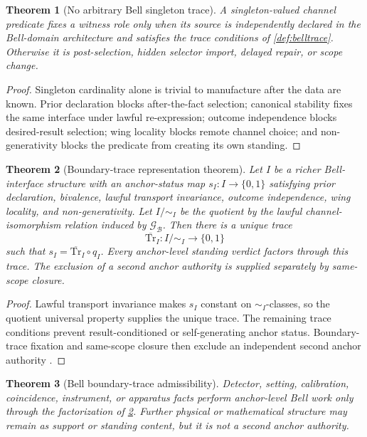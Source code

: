 \documentclass[11pt]{article}
\newtheorem{theorem}{Theorem}[section]
\theoremstyle{definition}
\newcommand{\Bell}{\mathcal{B}}
\newcommand{\Trace}{\mathrm{Tr}}
\newcommand{\BellLaw}{\mathscr{G}_{\Bell}}
\begin{document}
\begin{theorem}[No arbitrary Bell singleton trace]\label{thm:noarbitrarytrace}
A singleton-valued channel predicate fixes a witness role only when its source is independently declared in the Bell-domain architecture and satisfies the trace conditions of \cref{def:belltrace}. Otherwise it is post-selection, hidden selector import, delayed repair, or scope change.
\end{theorem}

\begin{proof}
Singleton cardinality alone is trivial to manufacture after the data are known. Prior declaration blocks after-the-fact selection; canonical stability fixes the same interface under lawful re-expression; outcome independence blocks desired-result selection; wing locality blocks remote channel choice; and non-generativity blocks the predicate from creating its own standing.
\end{proof}

\begin{theorem}[Boundary-trace representation theorem]\label{thm:tracefactorization}
Let $I$ be a richer Bell-interface structure with an anchor-status map $s_I:I\to\{0,1\}$ satisfying prior declaration, bivalence, lawful transport invariance, outcome independence, wing locality, and non-generativity. Let $I/\!\sim_I$ be the quotient by the lawful channel-isomorphism relation induced by $\BellLaw$. Then there is a unique trace
\[
\overline{\Trace}_I:I/\!\sim_I\to\{0,1\}
\]
such that $s_I=\overline{\Trace}_I\circ q_I$. Every anchor-level standing verdict factors through this trace. The exclusion of a second anchor authority is supplied separately by same-scope closure.
\end{theorem}

\begin{proof}
Lawful transport invariance makes $s_I$ constant on $\sim_I$-classes, so the quotient universal property supplies the unique trace. The remaining trace conditions prevent result-conditioned or self-generating anchor status. Boundary-trace fixation and same-scope closure then exclude an independent second anchor authority \cite{MaleyBoundaryTrace2026,MaleyBivalence2026}.
\end{proof}

\begin{theorem}[Bell boundary-trace admissibility]\label{thm:belltraceadmiss}
Detector, setting, calibration, coincidence, instrument, or apparatus facts perform anchor-level Bell work only through the factorization of \cref{thm:tracefactorization}. Further physical or mathematical structure may remain as support or standing content, but it is not a second anchor authority.
\end{theorem}
\end{document}
